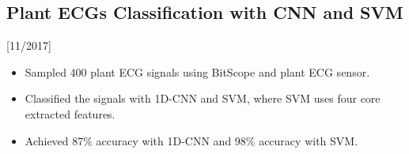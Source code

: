 \documentclass{mycv}
\begin{document}
\vspace{-\parskip}

\subsection{Plant ECGs Classification with CNN and SVM}[11/2017]

\vspace{-\parskip}

\begin{itemize}
  \item Sampled 400 plant ECG signals using BitScope and plant ECG sensor.
  \item Classified the signals with 1D-CNN and SVM, where SVM uses four core extracted features.
  \item Achieved 87\% accuracy with 1D-CNN and 98\% accuracy with SVM.
\end{itemize}






\vspace{-\parskip}
\end{document}

